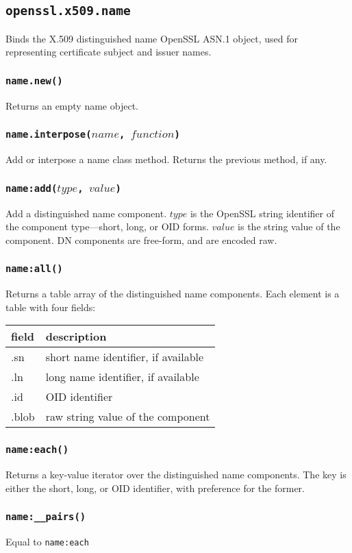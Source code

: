 \documentclass[11pt, oneside]{memoir}
\newcommand*{\fn}[1]{\texttt{#1}\xspace}
\newcommand*{\module}[1]{\texttt{#1}\xspace}
\newcounter{toccols}
\newenvironment{Module}[1]{
	\subsection{\texttt{#1}}
	\addtocontents{toc}{
		\protect\begin{multicols}{\value{toccols}}
	}
}{
	\addtocontents{toc}{\protect\end{multicols}}
}
\begin{document}
\begin{Module}{openssl.x509.name}

Binds the X.509 distinguished name OpenSSL ASN.1 object, used for representing certificate subject and issuer names.

\subsubsection[\fn{name.new}]{\fn{name.new()}}

Returns an empty name object.

\subsubsection[\fn{name.interpose}]{\fn{name.interpose($name$, $function$)}}

Add or interpose a name class method. Returns the previous method, if any.

\subsubsection[\fn{name:add}]{\fn{name:add($type$, $value$)}}

Add a distinguished name component. $type$ is the OpenSSL string identifier of the component type---short, long, or OID forms. $value$ is the string value of the component. DN components are free-form, and are encoded raw.

\subsubsection[\fn{name:all}]{\fn{name:all()}}

Returns a table array of the distinguished name components. Each element is a table with four fields:

\begin{tabular}{ l | l}
field & description\\\hline
.sn & short name identifier, if available\\
.ln & long name identifier, if available\\
.id & OID identifier\\
.blob & raw string value of the component
\end{tabular}

\subsubsection[\fn{name:each}]{\fn{name:each()}}

Returns a key-value iterator over the distinguished name components. The key is either the short, long, or OID identifier, with preference for the former.

\subsubsection[\fn{name:\_\_pairs}]{\fn{name:\_\_pairs()}}

Equal to \module{name:each}

\end{Module}
\end{document}
